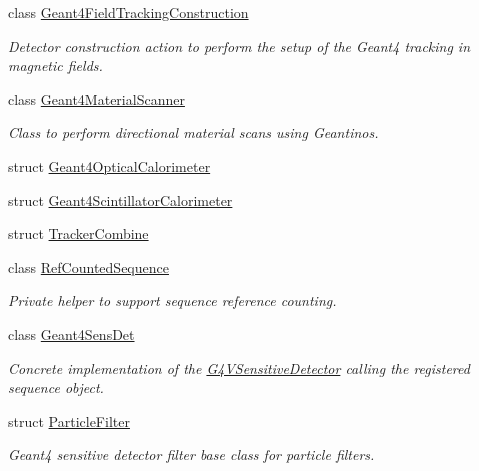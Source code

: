 \begin{DoxyCompactItemize}
class \hyperlink{class_d_d4hep_1_1_simulation_1_1_geant4_field_tracking_construction}{Geant4FieldTrackingConstruction}
\begin{DoxyCompactList}\small\item\em Detector construction action to perform the setup of the Geant4 tracking in magnetic fields. \item\end{DoxyCompactList}\item 
class \hyperlink{class_d_d4hep_1_1_simulation_1_1_geant4_material_scanner}{Geant4MaterialScanner}
\begin{DoxyCompactList}\small\item\em Class to perform directional material scans using Geantinos. \item\end{DoxyCompactList}\item 
struct \hyperlink{struct_d_d4hep_1_1_simulation_1_1_geant4_optical_calorimeter}{Geant4OpticalCalorimeter}
\item 
struct \hyperlink{struct_d_d4hep_1_1_simulation_1_1_geant4_scintillator_calorimeter}{Geant4ScintillatorCalorimeter}
\item 
struct \hyperlink{struct_d_d4hep_1_1_simulation_1_1_tracker_combine}{TrackerCombine}
\item 
class \hyperlink{class_d_d4hep_1_1_simulation_1_1_ref_counted_sequence}{RefCountedSequence}
\begin{DoxyCompactList}\small\item\em Private helper to support sequence reference counting. \item\end{DoxyCompactList}\item 
class \hyperlink{class_d_d4hep_1_1_simulation_1_1_geant4_sens_det}{Geant4SensDet}
\begin{DoxyCompactList}\small\item\em Concrete implementation of the \hyperlink{class_g4_v_sensitive_detector}{G4VSensitiveDetector} calling the registered sequence object. \item\end{DoxyCompactList}\item 
struct \hyperlink{struct_d_d4hep_1_1_simulation_1_1_particle_filter}{ParticleFilter}
\begin{DoxyCompactList}\small\item\em Geant4 sensitive detector filter base class for particle filters. \item\end{DoxyCompactList}\item 

\end{DoxyCompactItemize}
